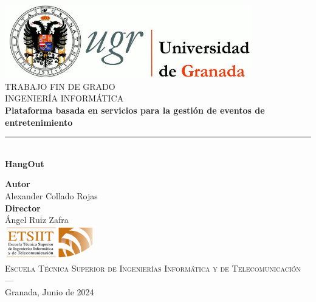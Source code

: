 \begin{titlepage}

    \newlength{\centeroffset}
    \setlength{\centeroffset}{-0.5\oddsidemargin}
    \addtolength{\centeroffset}{0.5\evensidemargin}
    \thispagestyle{empty}

    \noindent\hspace*{\centeroffset}\begin{minipage}{\textwidth}

        \centering
        \includegraphics[width=0.8\textwidth]{imagenes/logo_ugr.jpg}\\[1.4cm]

        \textsc{ \Large TRABAJO FIN DE GRADO\\[0.2cm]}
        \textsc{ INGENIERÍA INFORMÁTICA}\\[1cm]
        {\LARGE\bfseries Plataforma basada en servicios para la gestión de eventos de entretenimiento\\}
        \noindent\rule[-1ex]{\textwidth}{3pt}\\[4ex]
        {\large\bfseries HangOut}
    \end{minipage}

    \vspace{1cm}

    \noindent\hspace*{\centeroffset}\begin{minipage}{\textwidth}
        \centering
        \textbf{Autor}\\
        {Alexander Collado Rojas}\\[2.5ex]
        \textbf{Director}\\
        Ángel Ruiz Zafra\\[2cm]

        \includegraphics[width=0.3\textwidth]{imagenes/etsiit_logo.png}\\[0.1cm]
        \textsc{Escuela Técnica Superior de Ingenierías Informática y de Telecomunicación}\\
        \textsc{---}\\
        Granada, Junio de 2024
    \end{minipage}
\end{titlepage}

